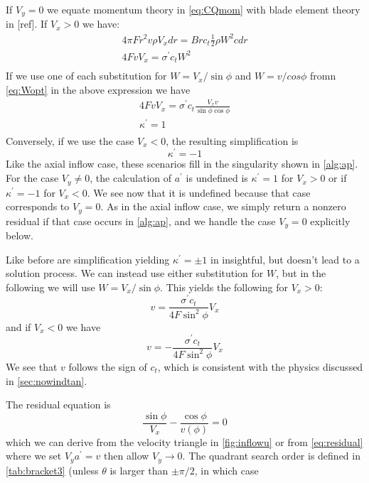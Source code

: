 \documentclass{article}
\begin{document}
If $V_y = 0$ we equate momentum theory in \cref{eq:CQmom} with blade element theory in [ref].  If $V_x > 0$ we have:
\begin{equation}
\begin{aligned}
4 \pi F r^2 v \rho V_x dr = B r c_t \frac{1}{2} \rho W^2 c dr\\
4  F v  V_x  = \sigma^\prime c_t  W^2 \\
\end{aligned}
\end{equation}
If we use one of each substitution for $W = V_x/\sin\phi$ and $W = v/cos\phi$ fromn \cref{eq:Wopt} in the above expression we have
\begin{equation}
\begin{aligned}
4  F v  V_x  = \sigma^\prime c_t \frac{V_x v}{\sin\phi \cos\phi} \\
\kappa^\prime = 1\\
\end{aligned}
\end{equation}
Conversely, if we use the case $V_x < 0$, the resulting simplification is
\begin{equation}
    \kappa^\prime = -1
\end{equation}
Like the axial inflow case, these scenarios fill in the singularity shown in \cref{alg:ap}.  For the case $V_y \ne 0$, the calculation of $a^\prime$ is undefined is $\kappa^\prime = 1$ for $V_x > 0$ or if $\kappa^\prime = -1$ for $V_x < 0$.  We see now that it is undefined because that case corresponds to $V_y = 0$.  As in the axial inflow case, we simply return a nonzero residual if that case occurs in \cref{alg:ap}, and we handle the case $V_y = 0$ explicitly below.



Like before are simplification yielding $\kappa^\prime = \pm1$ in insightful, but doesn't lead to a solution process.  We can instead use either substitution for $W$, but in the following we will use $W = V_x / \sin\phi$.  This yields the following for $V_x > 0$:
\begin{equation}
    v = \frac{\sigma^\prime c_t}{4 F \sin^2\phi} V_x
\end{equation}
and if $V_x < 0$ we have
\begin{equation}
    v = -\frac{\sigma^\prime c_t}{4 F \sin^2\phi} V_x
\end{equation}
We see that $v$ follows the sign of $c_t$, which is consistent with the physics discussed in \cref{sec:nowindtan}.

The residual equation is
\begin{equation}
    \frac{\sin\phi}{V_x} - \frac{\cos\phi}{v(\phi)} = 0
    \label{eq:noVyresid}
\end{equation}
which we can derive from the velocity triangle in \cref{fig:inflowu} or from \cref{eq:residual} where we set $V_y a^\prime = v$ then allow $V_y \rightarrow 0$.  The quadrant search order is defined in \cref{tab:bracket3} (unless $\theta$ is larger than $\pm \pi/2$, in which case
\end{document}
